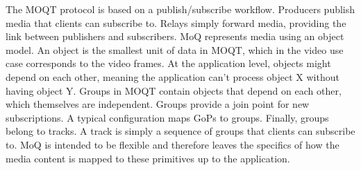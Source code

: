 The \ac{MOQT} protocol is based on a publish/subscribe workflow. Producers publish media that clients can subscribe to. Relays simply forward media, providing the link between publishers and subscribers. \ac{MoQ} represents media using an object model. An object is the smallest unit of data in \ac{MOQT}, which in the video use case corresponds to the video frames. At the application level, objects might depend on each other, meaning the application can't process object X without having object Y. Groups in \ac{MOQT} contain objects that depend on each other, which themselves are independent. Groups provide a join point for new subscriptions. A typical configuration maps \acp{GoP} to groups. Finally, groups belong to tracks. A track is simply a sequence of groups that clients can subscribe to. \ac{MoQ} is intended to be flexible and therefore leaves the specifics of how the media content is mapped to these primitives up to the application. 


